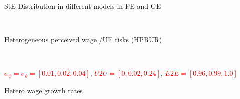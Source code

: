 \documentclass{beamer}
\begin{document}
\begin{frame}{StE Distribution in different models  in PE and GE}
	\label{StE_dist_compare}
	
	\begin{figure}[!ht]
		\begin{center}
			 \\
		\end{center}
	\end{figure}
	\hyperlink{appendix:calibration}{} %
\end{frame}



\begin{frame}{Heterogeneous perceived wage /UE risks (HPRUR)}
	\label{StE_dist_compare_HPRUR}
	
	\begin{figure}[!ht]
		\begin{center}
			 \\
		\end{center}
	\end{figure}
	{\scriptsize\textcolor{red}{$\sigma_\psi = \sigma_\theta = [0.01,0.02,0.04]$}, \textcolor{red}{$U2U=[0,0.02,0.24]$}, \textcolor{red}{$E2E = [0.96, 0.99, 1.0]$}} %
\end{frame}


\begin{frame}{Hetero wage growth rates}
	\label{hetero_growth_profile}
	
	\begin{figure}[!ht]
		\begin{center}
		\end{center}
	\end{figure}
\end{frame}
\end{document}
